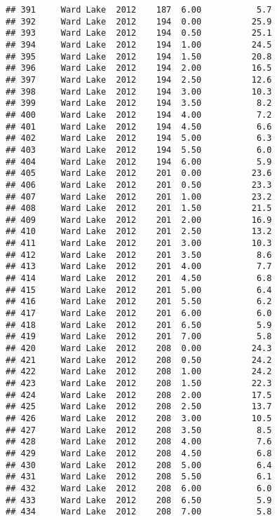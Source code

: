\documentclass[
]{article}
\newenvironment{Shaded}{\begin{snugshade}}{\end{snugshade}}
\newcommand{\FunctionTok}[1]{\textcolor[rgb]{0.00,0.00,0.00}{#1}}
\newcommand{\NormalTok}[1]{#1}
\newcommand{\OtherTok}[1]{\textcolor[rgb]{0.56,0.35,0.01}{#1}}
\newcommand{\SpecialCharTok}[1]{\textcolor[rgb]{0.00,0.00,0.00}{#1}}
\begin{document}
\begin{verbatim}
## 391     Ward Lake  2012    187  6.00           5.7
## 392     Ward Lake  2012    194  0.00          25.9
## 393     Ward Lake  2012    194  0.50          25.1
## 394     Ward Lake  2012    194  1.00          24.5
## 395     Ward Lake  2012    194  1.50          20.8
## 396     Ward Lake  2012    194  2.00          16.5
## 397     Ward Lake  2012    194  2.50          12.6
## 398     Ward Lake  2012    194  3.00          10.3
## 399     Ward Lake  2012    194  3.50           8.2
## 400     Ward Lake  2012    194  4.00           7.2
## 401     Ward Lake  2012    194  4.50           6.6
## 402     Ward Lake  2012    194  5.00           6.3
## 403     Ward Lake  2012    194  5.50           6.0
## 404     Ward Lake  2012    194  6.00           5.9
## 405     Ward Lake  2012    201  0.00          23.6
## 406     Ward Lake  2012    201  0.50          23.3
## 407     Ward Lake  2012    201  1.00          23.2
## 408     Ward Lake  2012    201  1.50          21.5
## 409     Ward Lake  2012    201  2.00          16.9
## 410     Ward Lake  2012    201  2.50          13.2
## 411     Ward Lake  2012    201  3.00          10.3
## 412     Ward Lake  2012    201  3.50           8.6
## 413     Ward Lake  2012    201  4.00           7.7
## 414     Ward Lake  2012    201  4.50           6.8
## 415     Ward Lake  2012    201  5.00           6.4
## 416     Ward Lake  2012    201  5.50           6.2
## 417     Ward Lake  2012    201  6.00           6.0
## 418     Ward Lake  2012    201  6.50           5.9
## 419     Ward Lake  2012    201  7.00           5.8
## 420     Ward Lake  2012    208  0.00          24.3
## 421     Ward Lake  2012    208  0.50          24.2
## 422     Ward Lake  2012    208  1.00          24.2
## 423     Ward Lake  2012    208  1.50          22.3
## 424     Ward Lake  2012    208  2.00          17.5
## 425     Ward Lake  2012    208  2.50          13.7
## 426     Ward Lake  2012    208  3.00          10.5
## 427     Ward Lake  2012    208  3.50           8.5
## 428     Ward Lake  2012    208  4.00           7.6
## 429     Ward Lake  2012    208  4.50           6.8
## 430     Ward Lake  2012    208  5.00           6.4
## 431     Ward Lake  2012    208  5.50           6.1
## 432     Ward Lake  2012    208  6.00           6.0
## 433     Ward Lake  2012    208  6.50           5.9
## 434     Ward Lake  2012    208  7.00           5.8
\end{verbatim}

\begin{Shaded}
\end{Shaded}
\end{document}
